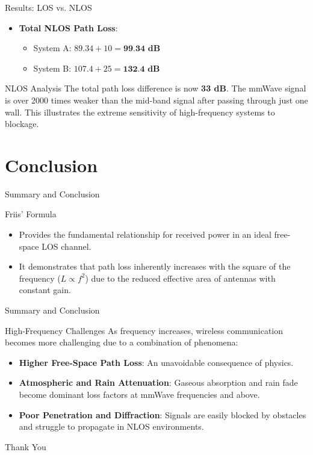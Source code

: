 \documentclass{beamer}
\begin{document}
	\begin{frame}{Results: LOS vs. NLOS}
		\begin{itemize}
			\item \textbf{Total NLOS Path Loss}:
			\begin{itemize}
				\item System A: $89.34 + 10 = \textbf{99.34 dB}$
				\item System B: $107.4 + 25 = \textbf{132.4 dB}$
			\end{itemize}
		\end{itemize}
		\vspace{1em}
		\begin{alertblock}{NLOS Analysis}
			The total path loss difference is now \textbf{33 dB}. The mmWave signal is over 2000 times weaker than the mid-band signal after passing through just one wall. This illustrates the extreme sensitivity of high-frequency systems to blockage.
		\end{alertblock}
	\end{frame}
	
	\section{Conclusion}
	
	\begin{frame}{Summary and Conclusion}
		\begin{block}{Friis' Formula}
			\begin{itemize}
				\item Provides the fundamental relationship for received power in an ideal free-space LOS channel.
				\item It demonstrates that path loss inherently increases with the square of the frequency ($L \propto f^2$) due to the reduced effective area of antennas with constant gain.
			\end{itemize}
		\end{block}
	\end{frame}
	
	\begin{frame}{Summary and Conclusion}
		\begin{alertblock}{High-Frequency Challenges}
			As frequency increases, wireless communication becomes more challenging due to a combination of phenomena:
			\begin{itemize}
				\item \textbf{Higher Free-Space Path Loss}: An unavoidable consequence of physics.
				\item \textbf{Atmospheric and Rain Attenuation}: Gaseous absorption and rain fade become dominant loss factors at mmWave frequencies and above.
				\item \textbf{Poor Penetration and Diffraction}: Signals are easily blocked by obstacles and struggle to propagate in NLOS environments.
			\end{itemize}
		\end{alertblock}
	\end{frame}
	
	\begin{frame}
		\centering
		\Huge Thank You
	\end{frame}
	
\end{document}
